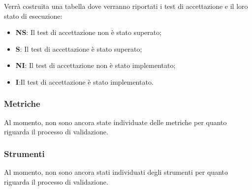 Verrà costruita una tabella dove verranno riportati i test di accettazione e il loro stato di esecuzione:
\begin{itemize}
		\item \textbf{NS}: Il test di accettazione non è stato superato;
		\item \textbf{S}: Il test di accettazione è stato superato;
		\item \textbf{NI}: Il test di accettazione non è stato implementato;
		\item \textbf{I}:Il test di accettazione è stato implementato.
\end{itemize}

\subsubsection{Metriche}
Al momento, non sono ancora state individuate delle metriche per quanto riguarda il processo di validazione.
\subsubsection{Strumenti}
Al momento, non sono ancora stati individuati degli strumenti per quanto riguarda il processo di validazione.
